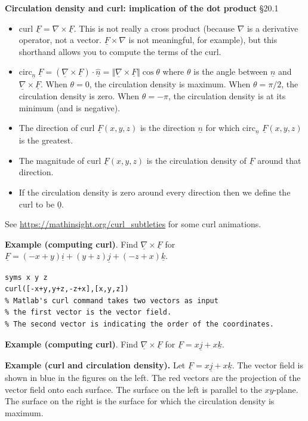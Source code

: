 \documentclass[12pt,letterpaper,noanswers]{exam}
\newcommand{\mb}[1]{\underline{#1}}
\begin{document}
\eject
\noindent\textbf{Circulation density and curl: implication of the dot product} \S 20.1
\begin{tcolorbox}
\begin{itemize}
\itemsep0em
    \item $\text{curl }\mb F = \nabla \times \mb F$.  This is not really a cross product (because $\nabla$ is a derivative operator, not a vector.  $\mb F\times\nabla$ is not meaningful, for example), but this shorthand allows you to compute the terms of the curl.
    \item $\displaystyle\text{circ}_{\mb n}\ \mb F = \left(\mb\nabla\times\mb F\right)\cdot \hat {\underline n} = \Vert\mb\nabla\times\mb F\Vert\cos\theta$ where $\theta$ is the angle between $\mb n$ and $\mb\nabla\times\mb F$.  When $\theta = 0$, the circulation density is maximum.  When $\theta = \pi/2$, the circulation density is zero.  When $\theta = -\pi$, the circulation density is at its minimum (and is negative).
    \item The direction of curl $\mb F(x,y,z)$ is the direction $\mb n$ for which circ$_{\mb n}$ $\mb F(x,y,z)$ is the greatest.
    \item The magnitude of curl $\mb F(x,y,z)$ is the circulation density of $\mb F$ around that direction.
    \item 
If the circulation density is zero around every direction then we define the curl to be $\mb 0$.
\end{itemize}
See \url{https://mathinsight.org/curl_subtleties} for some curl animations.
\end{tcolorbox}
\noindent\textbf{Example (computing curl)}.  Find $\mb\nabla\times\mb F$ for $\mb F = (-x+y)\mb i + (y+z)\mb j + (-z+x)\mb k$.


\begin{lstlisting}
syms x y z
curl([-x+y,y+z,-z+x],[x,y,z])
% Matlab's curl command takes two vectors as input
% the first vector is the vector field.
% The second vector is indicating the order of the coordinates.
\end{lstlisting}

\vspace{1in}

\noindent\textbf{Example (computing curl)}.  Find $\mb\nabla\times\mb F$ for $\mb F =  x\mb j + x\mb k$.

\vspace{1.5in}


\noindent\textbf{Example (curl and circulation density).}  Let $\mb F = x\mb j + x\mb k$.  The vector field is shown in blue in the figures on the left.  The red vectors are the projection of the vector field onto each surface.  The surface on the left is parallel to the $xy$-plane.  The surface on the right is the surface for which the circulation density is maximum.
\end{document}
